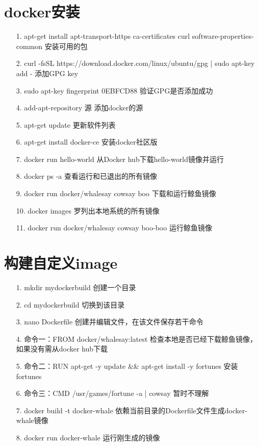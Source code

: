 \documentclass[a4paper,left=1.5cm,right=1.5cm,11pt]{article}
\begin{document}
\tableofcontents

\clearpage

\section{docker安装}
\begin{itemize}
	\item[1.]apt-get install apt-transport-https ca-certificates curl software-properties-common 安装可用的包
	\item[2.]curl -fsSL https://download.docker.com/linux/ubuntu/gpg | sudo apt-key add - 添加GPG key
	\item[3.]sudo apt-key fingerprint 0EBFCD88 验证GPG是否添加成功
	\item[4.]add-apt-repository 源 添加docker的源
	\item[5.]apt-get update 更新软件列表
	\item[6.]apt-get install docker-ce 安装docker社区版
	\item[7.]docker run hello-world  从Docker hub下载hello-world镜像并运行
	\item[8.]docker ps -a  查看运行和已退出的所有镜像
	\item[9.]docker run docker/whalesay cowsay boo 下载和运行鲸鱼镜像
	\item[10.]docker images   罗列出本地系统的所有镜像
	\item[11.]docker run docker/whalesay cowsay boo-boo 运行鲸鱼镜像
\end{itemize}

\section{构建自定义image}
\begin{itemize}
	\item[1.]mkdir mydockerbuild 创建一个目录
	\item[2.]cd mydockerbuild    切换到该目录
	\item[3.]nano Dockerfile     创建并编辑文件，在该文件保存若干命令
	\item[4.]命令一：FROM docker/whalesay:latest 检查本地是否已经下载鲸鱼镜像，如果没有需从docker hub下载
	\item[5.]命令二：RUN apt-get -y update \&\& apt-get install -y fortunes 安装fortunes
	\item[6.]命令三：CMD /usr/games/fortune -a | cowsay 暂时不理解
	\item[7.]docker build -t docker-whale \.  依赖当前目录的Dockerfile文件生成docker-whale镜像
	\item[8.]docker run docker-whale  运行刚生成的镜像
\end{itemize}
\end{document}
